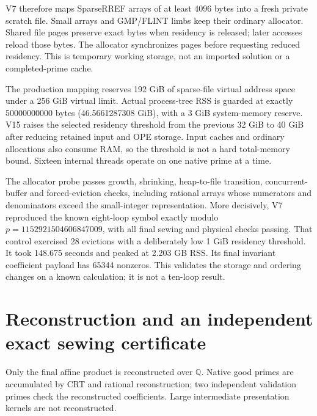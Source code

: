 \documentclass[11pt]{article}
\begin{document}
V7 therefore maps SparseRREF arrays of at least 4096 bytes into a fresh
private scratch file. Small arrays and GMP/FLINT limbs keep their ordinary
allocator. Shared file pages preserve exact bytes when residency is
released; later accesses reload those bytes. The allocator synchronizes
pages before requesting reduced residency. This is temporary working
storage, not an imported solution or a completed-prime cache.

The production mapping reserves 192 GiB of sparse-file virtual address
space under a 256 GiB virtual limit. Actual process-tree RSS is guarded at
exactly 50000000000 bytes (46.5661287308 GiB), with a 3 GiB system-memory
reserve. V15 raises the selected residency threshold from the previous
32 GiB to 40 GiB after reducing retained input and OPE storage. Input caches and ordinary
allocations also consume RAM, so the threshold is not a hard total-memory
bound. Sixteen internal threads operate on one native prime at a time.

The allocator probe passes growth, shrinking, heap-to-file transition,
concurrent-buffer and forced-eviction checks, including rational arrays
whose numerators and denominators exceed the small-integer representation.
More decisively, V7 reproduced the known eight-loop symbol exactly modulo
$p=1152921504606847009$, with all final sewing and physical checks passing.
That control exercised 28 evictions with a deliberately low 1 GiB
residency threshold. It took 148.675 seconds and peaked at 2.203 GB RSS.
Its final invariant coefficient payload has 65344 nonzeros. This validates
the storage and ordering changes on a known calculation; it is not a
ten-loop result.

\section{Reconstruction and an independent exact sewing certificate}
Only the final affine product is reconstructed over $\mathbb Q$.
Native good primes are accumulated by CRT and rational reconstruction;
two independent validation primes check the reconstructed coefficients.
Large intermediate presentation kernels are not reconstructed.
\end{document}
